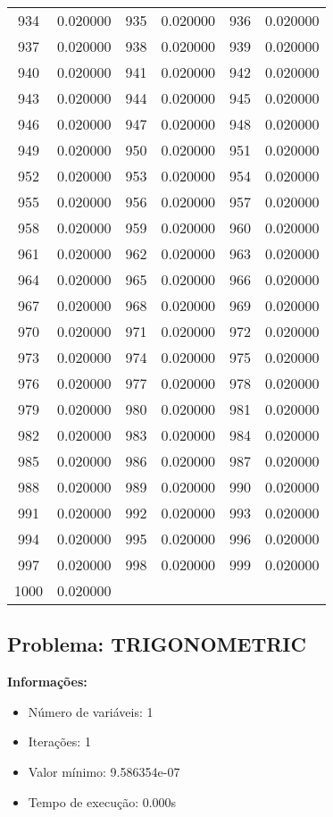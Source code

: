 \documentclass[12pt]{article}
\begin{document}
\begin{longtable}{@{}cc|cc|cc@{}}
934 & 0.020000 & 935 & 0.020000 & 936 & 0.020000 \\
937 & 0.020000 & 938 & 0.020000 & 939 & 0.020000 \\
940 & 0.020000 & 941 & 0.020000 & 942 & 0.020000 \\
943 & 0.020000 & 944 & 0.020000 & 945 & 0.020000 \\
946 & 0.020000 & 947 & 0.020000 & 948 & 0.020000 \\
949 & 0.020000 & 950 & 0.020000 & 951 & 0.020000 \\
952 & 0.020000 & 953 & 0.020000 & 954 & 0.020000 \\
955 & 0.020000 & 956 & 0.020000 & 957 & 0.020000 \\
958 & 0.020000 & 959 & 0.020000 & 960 & 0.020000 \\
961 & 0.020000 & 962 & 0.020000 & 963 & 0.020000 \\
964 & 0.020000 & 965 & 0.020000 & 966 & 0.020000 \\
967 & 0.020000 & 968 & 0.020000 & 969 & 0.020000 \\
970 & 0.020000 & 971 & 0.020000 & 972 & 0.020000 \\
973 & 0.020000 & 974 & 0.020000 & 975 & 0.020000 \\
976 & 0.020000 & 977 & 0.020000 & 978 & 0.020000 \\
979 & 0.020000 & 980 & 0.020000 & 981 & 0.020000 \\
982 & 0.020000 & 983 & 0.020000 & 984 & 0.020000 \\
985 & 0.020000 & 986 & 0.020000 & 987 & 0.020000 \\
988 & 0.020000 & 989 & 0.020000 & 990 & 0.020000 \\
991 & 0.020000 & 992 & 0.020000 & 993 & 0.020000 \\
994 & 0.020000 & 995 & 0.020000 & 996 & 0.020000 \\
997 & 0.020000 & 998 & 0.020000 & 999 & 0.020000 \\
1000 & 0.020000 &  &  &  &  \\

\end{longtable}


\newpage            
\subsection{Problema: TRIGONOMETRIC}

\textbf{Informações:}
\begin{itemize}
\item Número de variáveis: 1
\item Iterações: 1
\item Valor mínimo: 9.586354e-07
\item Tempo de execução: 0.000s
\end{itemize}
\end{document}
